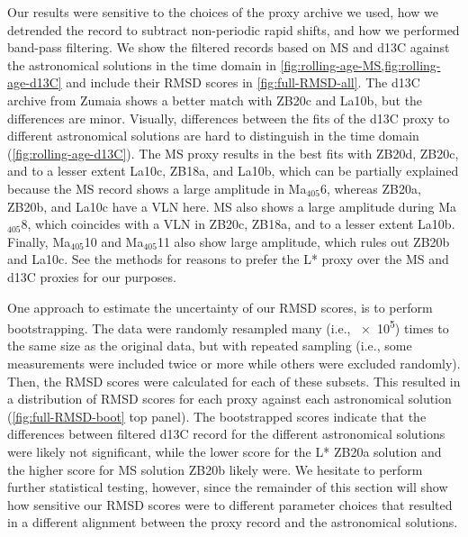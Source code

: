 \documentclass[]{agujournal2019}
\newcommand{\ma}[1]{Ma\(_{405}\)#1} %
\begin{document}
Our results were sensitive to the choices of the proxy archive we used, how we detrended the record to subtract non-periodic rapid shifts, and how we performed band-pass filtering.
We show the filtered records based on \gls{MS} and \gls{d13C} against the astronomical solutions in the time domain in \cref{fig:rolling-age-MS,fig:rolling-age-d13C} and include their \gls{RMSD} scores in \cref{fig:full-RMSD-all}.
The \gls{d13C} archive from Zumaia shows a better match with ZB20c and La10b, but the differences are minor.
Visually, differences between the fits of the \gls{d13C} proxy to different astronomical solutions are hard to distinguish in the time domain (\cref{fig:rolling-age-d13C}).
The \gls{MS} proxy results in the best fits with ZB20d, ZB20c, and to a lesser extent La10c, ZB18a, and La10b, which can be partially explained because the \gls{MS} record shows a large amplitude in \ma{6}, whereas ZB20a, ZB20b, and La10c have a \gls{VLN} here.
\gls{MS} also shows a large amplitude during \ma{8}, which coincides with a \gls{VLN} in ZB20c, ZB18a, and to a lesser extent La10b.
Finally, \ma{10} and \ma{11} also show large amplitude, which rules out ZB20b and La10c.
See the methods for reasons to prefer the \gls{L*} proxy over the \gls{MS} and \gls{d13C} proxies for our purposes.

One approach to estimate the uncertainty of our \gls{RMSD} scores, is to perform bootstrapping.
The data were randomly resampled many (i.e., \num{e5}) times to the same size as the original data, but with repeated sampling (i.e., some measurements were included twice or more while others were excluded randomly).
Then, the \gls{RMSD} scores were calculated for each of these subsets.
This resulted in a distribution of \gls{RMSD} scores for each proxy against each astronomical solution (\cref{fig:full-RMSD-boot} top panel).
The bootstrapped scores indicate that the differences between filtered \gls{d13C} record for the different astronomical solutions were likely not significant,
while the lower score for the \gls{L*} ZB20a solution
and the higher score for \gls{MS} solution ZB20b
likely were.
We hesitate to perform further statistical testing, however, since the remainder of this section will show how sensitive our \gls{RMSD} scores were to different parameter choices that resulted in a different alignment between the proxy record and the astronomical solutions.
\end{document}
